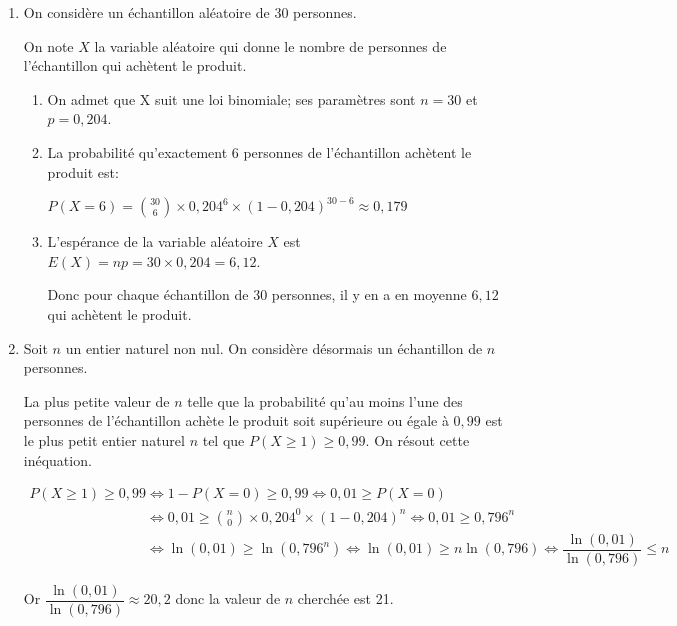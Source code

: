 \documentclass[10pt]{article}
\providecommand{\ds}{\displaystyle}
\begin{document}
\begin{enumerate}
\item On considère un échantillon aléatoire de $30$ personnes.

On note $X$ la variable aléatoire qui donne le nombre de personnes de l'échantillon qui achètent le produit.
	\begin{enumerate}
		\item On admet que X suit une loi binomiale; ses paramètres sont $n=30$ et $p=0,204$.
		
		\item La probabilité qu'exactement 6 personnes de l'échantillon achètent le produit est:
		
$P(X=6)= \ds\binom{30}{6}\times 0,204^{6}\times \left (1-0,204\right )^{30-6}
\approx 0,179$
		
		

		\item 
L'espérance de la variable aléatoire $X$ est $E(X)=np = 30\times 0,204 = 6,12$.

Donc pour chaque échantillon de 30 personnes, il y en a en moyenne $6,12$ qui achètent le produit.

	\end{enumerate}
\item Soit $n$ un entier naturel non nul.
On considère désormais un échantillon de $n$ personnes. 

La plus petite valeur de $n$ telle que la probabilité qu'au moins l'une des personnes de l'échantillon achète le produit soit supérieure ou égale à $0,99$ est le plus petit entier naturel $n$ tel que $P(X\geqslant 1) \geqslant 0,99$. On résout cette inéquation.

$\begin{gathered}P(X\geqslant 1) \geqslant 0,99
\iff 1-P(X=0) \geqslant 0,99
\iff 0,01 \geqslant P(X=0)\\
\phantom{P(X\geqslant 1) \geqslant 0,99}
\iff 0,01 \geqslant \ds\binom{n}{0}\times  0,204^0 \times (1-0,204)^n
\iff 0,01\geqslant 0,796^n\\
\phantom{P(X\geqslant 1) \geqslant 0,99}
\iff \ln(0,01) \geqslant \ln\left (0,796^n\right )
\iff \ln(0,01) \geqslant n\ln(0,796)
\iff \dfrac{\ln(0,01)}{\ln(0,796)} \leqslant n\end{gathered}$

Or $\dfrac{\ln(0,01)}{\ln(0,796)}\approx 20,2$ donc la valeur de $n$ cherchée est 21.

\end{enumerate}

\bigskip
\end{document}
